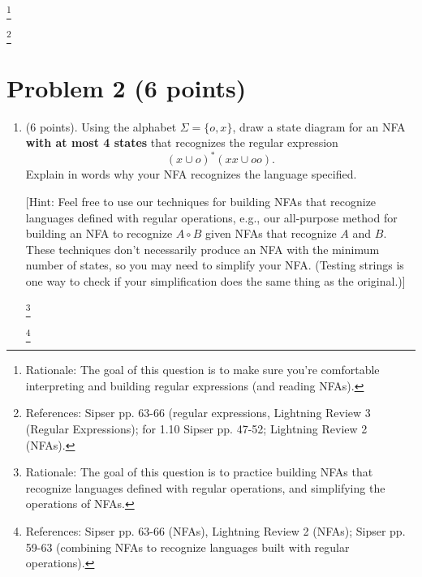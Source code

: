 \documentclass[letterpaper,11pt,twoside]{article}
\theoremstyle{plain}
\theoremstyle{definition}
\theoremstyle{remark}
\theoremstyle{restate}
\newcommand\blfootnote[1]{%
  \begingroup
  \renewcommand\thefootnote{}\footnote{#1}%
  \addtocounter{footnote}{-1}%
  \endgroup
}
\begin{document}
\blfootnote{ Rationale: The goal of this question is to make sure you're comfortable interpreting and building regular expressions (and reading NFAs). }
\blfootnote{ References: Sipser pp. 63-66 (regular expressions, Lightning Review 3 (Regular Expressions); for 1.10 Sipser pp. 47-52; Lightning Review 2 (NFAs).}




\clearpage
\section{Problem 2 (6 points)}

\begin{enumerate}
    \item (6 points). Using the alphabet $\Sigma = \{o, x\}$, draw a state diagram for an NFA \textbf{with at most 4 states} that recognizes the regular expression
    \[
            (x \cup o)^*(xx \cup oo).
    \]
    Explain in words why your NFA recognizes the language specified.
        
    [Hint: Feel free to use our techniques for building NFAs that recognize languages defined with regular operations, e.g., our all-purpose method for building an NFA to recognize $A \circ B$ given NFAs that recognize $A$ and $B$. These techniques don't necessarily produce an NFA with the minimum number of states, so you may need to simplify your NFA. (Testing strings is one way to check if your simplification does the same thing as the original.)]
    
    \blfootnote{ Rationale: The goal of this question is to practice building NFAs that recognize languages defined with regular operations, and simplifying the operations of NFAs. }
    \blfootnote{ References: Sipser pp. 63-66 (NFAs), Lightning Review 2 (NFAs); Sipser pp. 59-63 (combining NFAs to recognize languages built with regular operations). }

    
\end{enumerate}

\clearpage
\end{document}
